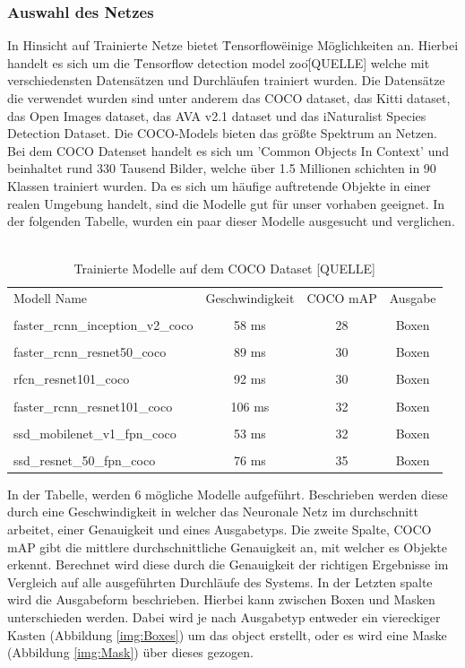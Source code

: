 \documentclass[a4paper,12pt,oneside]{article}
\begin{document}
  \subsubsection{Auswahl des Netzes} 
In Hinsicht auf Trainierte Netze bietet \"Tensorflow\" einige Möglichkeiten an. Hierbei handelt es sich um die \"Tensorflow detection model zoo\"[QUELLE] welche mit verschiedensten Datensätzen und Durchläufen trainiert wurden. Die Datensätze die verwendet wurden sind unter anderem das COCO dataset, das Kitti dataset, das Open Images dataset, das AVA v2.1 dataset und das iNaturalist Species Detection Dataset. Die COCO-Models bieten das größte Spektrum an Netzen. Bei dem COCO Datenset handelt es sich um 'Common Objects In Context' und beinhaltet rund 330 Tausend Bilder, welche über 1.5 Millionen schichten in 90 Klassen trainiert wurden. Da es sich um häufige auftretende Objekte in einer realen Umgebung handelt, sind die Modelle gut für unser vorhaben geeignet. In der folgenden Tabelle, wurden ein paar dieser Modelle ausgesucht und verglichen.
\\
\\

\begin{table}
[h]
\begin{tabular}{|l|c|c|c|}
 
Modell Name & Geschwindigkeit & COCO mAP & Ausgabe\\
 & & & \\
faster\_rcnn\_inception\_v2\_coco & 58 ms & 28 & Boxen\\
 & & & \\
faster\_rcnn\_resnet50\_coco & 89 ms & 30 & Boxen\\
 & & & \\
rfcn\_resnet101\_coco & 92 ms & 30 & Boxen\\
 & & & \\
faster\_rcnn\_resnet101\_coco & 106 ms & 32 & Boxen\\
 & & & \\
ssd\_mobilenet\_v1\_fpn\_coco & 53 ms & 32 & Boxen\\
 & & & \\
ssd\_resnet\_50\_fpn\_coco & 76 ms & 35 & Boxen

\vspace{0.5 cm}
 
\end{tabular}
\caption{Trainierte Modelle auf dem COCO Dataset [QUELLE]}
\end{table}


In der Tabelle, werden 6 mögliche Modelle aufgeführt. Beschrieben werden diese durch eine Geschwindigkeit in welcher das Neuronale Netz im durchschnitt arbeitet, einer Genauigkeit und eines Ausgabetyps. Die zweite Spalte, COCO mAP gibt die mittlere durchschnittliche Genauigkeit an, mit welcher es Objekte erkennt. Berechnet wird diese durch die Genauigkeit der richtigen Ergebnisse im Vergleich auf alle ausgeführten Durchläufe des Systems. In der Letzten spalte wird die Ausgabeform beschrieben. Hierbei kann zwischen Boxen und Masken unterschieden werden. Dabei wird je nach Ausgabetyp entweder ein viereckiger Kasten (Abbildung \ref{img:Boxes}) um das object erstellt, oder es wird eine Maske (Abbildung \ref{img:Mask}) über dieses gezogen.
\end{document}
